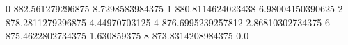 0 882.561279296875 8.7298583984375
1 880.8114624023438 6.98004150390625
2 878.2811279296875 4.44970703125
4 876.6995239257812 2.86810302734375
6 875.4622802734375 1.630859375
8 873.8314208984375 0.0
